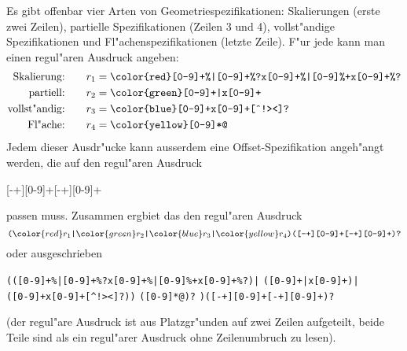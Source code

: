 \begin{loesung}
Es gibt offenbar vier Arten von Geometriespezifikationen: Skalierungen 
(erste zwei Zeilen),
partielle Spezifikationen (Zeilen 3 und 4), vollst"andige Spezifikationen
und Fl"achenspezifikationen (letzte Zeile).
F"ur jede kann man einen regul"aren Ausdruck angeben:
\begin{align*}
\text{Skalierung:}\qquad&r_1 = \texttt{\color{red}[0-9]+\%|[0-9]+\%?x[0-9]+\%|[0-9]\%+x[0-9]+\%?}
\\
\text{partiell:}\qquad&r_2 = \texttt{\color{green}[0-9]+|x[0-9]+}
\\
\text{vollst"andig:}\qquad&r_3 = \texttt{\color{blue}[0-9]+x[0-9]+[\^{}!><]?}
\\
\text{Fl"ache:}\qquad&r_4 = \texttt{\color{yellow}[0-9]*@}
\end{align*}
Jedem dieser Ausdr"ucke kann ausserdem eine Offset-Spezifikation angeh"angt
werden, die auf den regul"aren Ausdruck
\begin{center}
[-+][0-9]+[-+][0-9]+
\end{center}
passen muss. Zusammen ergbiet das den regul"aren Ausdruck
\[
\texttt{(}
{\color{red} r_1}
\texttt{|}
{\color{green} r_2}
\texttt{|}
{\color{blue} r_3}
\texttt{|}
{\color{yellow} r_4}
\texttt{)([-+][0-9]+[-+][0-9]+)?}
\]
oder ausgeschrieben
\begin{center}
\texttt{(({\color{red}[0-9]+\%|[0-9]+\%?x[0-9]+\%|[0-9]\%+x[0-9]+\%?})|}%
\texttt{({\color{green}[0-9]+|x[0-9]+})|}\\
\texttt{({\color{blue}[0-9]+x[0-9]+[\^{}!><]?}))}%
\texttt{({\color{yellow}[0-9]*@})?}%
\texttt{)([-+][0-9]+[-+][0-9]+)?}
\end{center}
(der regul"are Ausdruck ist aus Platzgr"unden auf zwei Zeilen aufgeteilt,
beide Teile sind als ein regul"arer Ausdruck ohne Zeilenumbruch zu lesen).
\end{loesung}

